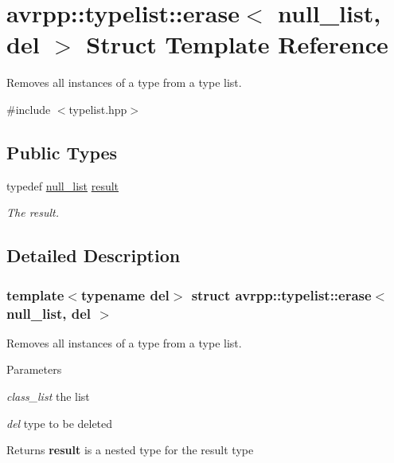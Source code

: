 \hypertarget{structavrpp_1_1typelist_1_1erase_3_01null__list_00_01del_01_4}{
\section{avrpp::typelist::erase$<$ null\_\-list, del $>$ Struct Template Reference}
\label{structavrpp_1_1typelist_1_1erase_3_01null__list_00_01del_01_4}
}


Removes all instances of a type from a type list.  




{\ttfamily \#include $<$typelist.hpp$>$}

\subsection*{Public Types}
\begin{DoxyCompactItemize}
\item 
typedef \hyperlink{structavrpp_1_1typelist_1_1null__list}{null\_\-list} \hyperlink{structavrpp_1_1typelist_1_1erase_3_01null__list_00_01del_01_4_af131c5d4382f83489877aa5d51261d58}{result}
\begin{DoxyCompactList}\small\item\em The result. \item\end{DoxyCompactList}\end{DoxyCompactItemize}


\subsection{Detailed Description}
\subsubsection*{template$<$typename del$>$ struct avrpp::typelist::erase$<$ null\_\-list, del $>$}

Removes all instances of a type from a type list. 
\begin{DoxyParams}{Parameters}
\item[{\em class\_\-list}]the list \item[{\em del}]type to be deleted \end{DoxyParams}
\begin{DoxyReturn}{Returns}
{\bfseries result} is a nested type for the result type 
\end{DoxyReturn}


